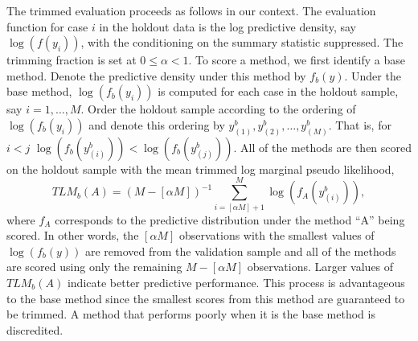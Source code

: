 \documentclass[ba]{imsart}
\begin{document}
The trimmed evaluation proceeds as follows in our context.  The evaluation function for case $i$ in the holdout data
is the log predictive density, say
$\log(f(y_i))$, with the conditioning on the 
summary statistic suppressed.  The trimming 
fraction is set at $0 \leq \alpha < 1$. To score a method,
we first identify a base method. Denote the predictive density under this method by $f_{b}(y)$.  Under the base method, $\log(f_{b}(y_i))$ is computed for each case in the 
holdout sample, say $i = 1, \ldots, M$.  Order the holdout sample according to the ordering of $\log(f_{b}(y_i))$ and denote this
ordering by $y_{(1)}^b, y_{(2)}^b, \dots, y_{(M)}^b$. That is, for $i<j$
$\log(f_{b}(y_{(i)}^b))<\log(f_{b}(y_{(j)}^b))$. All of the methods are then scored on the holdout sample with the mean trimmed log marginal pseudo likelihood, 
\[TLM_b(A) = (M - [\alpha M])^{-1} \sum_{i=[\alpha M]+1}^{M}
    \log(f_A(y_{(i)}^b)),\]
 where $f_A$ corresponds to the predictive
 distribution under the method ``A'' being scored.  In other words, the $[\alpha M]$ observations with the smallest values of $\log(f_{b}(y))$ are 
removed from the validation sample and all of the methods are scored using only the
remaining $M - [\alpha M]$ observations. Larger values of $TLM_b(A)$ indicate better predictive performance. This process is advantageous to the base method since the smallest scores from this method are guaranteed to be trimmed.  A method
that performs poorly when it is the base method is discredited.  %
\end{document}

